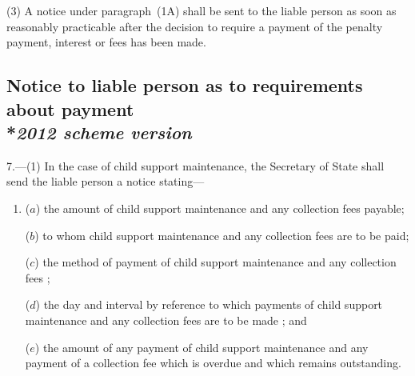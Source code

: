 \documentclass[12pt,a4paper]{article}
\begin{document}
(3) A notice under paragraph~(1A) shall be sent to the liable person as soon as reasonably practicable after the decision to require a payment of the penalty payment, interest or fees has been made.


\subsection[7. Notice to liable person as to requirements about payment --- \emph{2012 scheme version}]{Notice to liable person as to requirements about payment\\*\emph{2012 scheme version}}

7.—(1) 
In the case of child support maintenance,  %
the Secretary of State shall send the liable person a notice stating—
\begin{enumerate}\item[]
($a$) the amount of child support maintenance 
and any collection fees  %
payable;

($b$) to whom 
child support maintenance and any collection fees are  %
to be paid;

($c$) the method of payment
of child support maintenance and any collection fees%
; 

($d$) the day and interval by reference to which payments 
of child support maintenance and any collection fees  %
are to be made%
; and

($e$) the amount of any payment of child support maintenance 
and any payment of a collection fee  %
which is overdue and which remains outstanding.
\end{enumerate}
\end{document}
